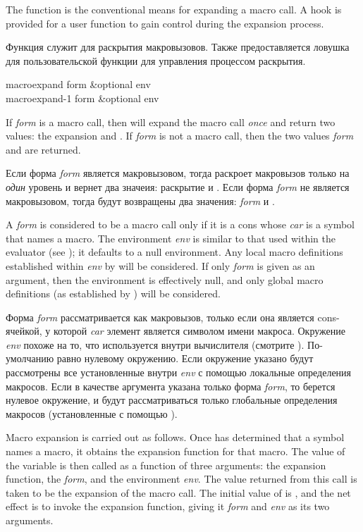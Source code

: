 The  function is the conventional means for
expanding a macro call.  A hook is provided for a user function
to gain control during the expansion process.

Функция  служит для раскрытия макровызовов. Также
предоставляется ловушка для пользовательской функции для управления процессом
раскрытия.

\begin{defun}[Function]
macroexpand form &optional env \\
macroexpand-1 form &optional env

If \emph{form} is a macro call, then  will expand the macro
call \emph{once} and return two values: the expansion and .
If \emph{form} is not a macro call, then the two values \emph{form} and {\nil} are
returned.

Если форма \emph{form} является макровызовом, тогда  раскроет
макровызов только на \emph{один} уровень и вернет два значеия:
раскрытие и .
Если форма \emph{form} не является макровызовом, тогда будут возвращены два
значения: \emph{form} и {\nil}.

A \emph{form} is considered to be a macro call only if it is a cons whose
\emph{car} is a symbol that names a macro.  The environment \emph{env} is similar
to that used within the evaluator (see );
it defaults to a null environment.
Any local macro definitions established within \emph{env} by
 will be considered.  If only \emph{form} is given as an
argument, then the environment is effectively null,
and only global macro definitions
(as established by ) will be considered.

Форма \emph{form} рассматривается как макровызов, только если она является
cons-ячейкой, у которой \emph{car} элемент является символом имени макроса. 
Окружение \emph{env} похоже на то, что используется внутри вычислителя (смотрите
). По-умолчанию равно нулевому окружению.
Если окружение указано будут рассмотрены все установленные внутри \emph{env} с
помощью  локальные определения макросов. Если в качестве аргумента
указана только форма \emph{form}, то берется нулевое окружение, и будут
рассматриваться только глобальные определения макросов (установленные с помощью
).

Macro expansion is carried out as follows.  Once  has
determined that a symbol names a macro, it obtains the expansion
function for that macro.  The value of the variable
 is then called as a function of three arguments:
the expansion function, the \emph{form}, and the environment \emph{env}.
The value returned from
this call is taken to be the expansion of the macro call.
The initial value of  is ,
and the net effect is to invoke the expansion function, giving
it \emph{form} and \emph{env} as its two arguments.


\end{defun}
